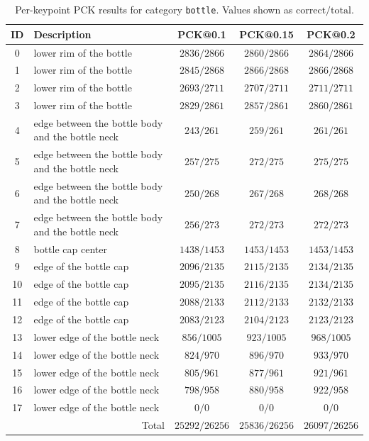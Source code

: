 \begin{table}[h]
\centering
\small
\caption{Per-keypoint PCK results for category \texttt{bottle}. Values shown as $\text{correct}/\text{total}$.}
\label{tab:pck_bottle}
\begin{tabular}{cl ccc}
\toprule
ID & Description & PCK@0.1 & PCK@0.15 & PCK@0.2 \\
\midrule
0 & lower rim of the bottle & $2836/2866$ & $2860/2866$ & $2864/2866$ \\
1 & lower rim of the bottle & $2845/2868$ & $2866/2868$ & $2866/2868$ \\
2 & lower rim of the bottle & $2693/2711$ & $2707/2711$ & $2711/2711$ \\
3 & lower rim of the bottle & $2829/2861$ & $2857/2861$ & $2860/2861$ \\
4 & edge between the bottle body and the bottle neck & $243/261$ & $259/261$ & $261/261$ \\
5 & edge between the bottle body and the bottle neck & $257/275$ & $272/275$ & $275/275$ \\
6 & edge between the bottle body and the bottle neck & $250/268$ & $267/268$ & $268/268$ \\
7 & edge between the bottle body and the bottle neck & $256/273$ & $272/273$ & $272/273$ \\
8 & bottle cap center & $1438/1453$ & $1453/1453$ & $1453/1453$ \\
9 & edge of the bottle cap & $2096/2135$ & $2115/2135$ & $2134/2135$ \\
10 & edge of the bottle cap & $2095/2135$ & $2116/2135$ & $2134/2135$ \\
11 & edge of the bottle cap & $2088/2133$ & $2112/2133$ & $2132/2133$ \\
12 & edge of the bottle cap & $2083/2123$ & $2104/2123$ & $2123/2123$ \\
13 & lower edge of the bottle neck & $856/1005$ & $923/1005$ & $968/1005$ \\
14 & lower edge of the bottle neck & $824/970$ & $896/970$ & $933/970$ \\
15 & lower edge of the bottle neck & $805/961$ & $877/961$ & $921/961$ \\
16 & lower edge of the bottle neck & $798/958$ & $880/958$ & $922/958$ \\
17 & lower edge of the bottle neck & $0/0$ & $0/0$ & $0/0$ \\
\midrule
\multicolumn{2}{r}{Total} & $25292/26256$ & $25836/26256$ & $26097/26256$ \\
\bottomrule
\end{tabular}
\end{table}

